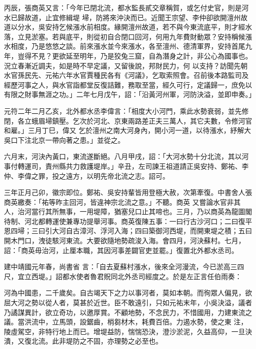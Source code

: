 \begin{pinyinscope}
 丙辰，張商英又言：「今年已閉北流，都水監長貳交章稱賀，或乞付史官，則是河水已歸故道，止宜修緝堤
 埽，防將來沖決而已。近聞王宗望、李仲卻欲開澶州故道以分水，吳安持乞候漲水前相度。緣開澶州故道，若不與今東流底平，則才經水落，立見淤塞。若與底平，則從初自合閉口回河，何用九年費財動眾？安持稱候漲水相度，乃是悠悠之談。前來漲水並今來漲水，各至澶州、德清軍界，安持首尾九年，豈得不見？更欲延至明年，乃是狡兔三窟，自為潛身之計，非公心為國事也。況立春漸近調夫，如是時不早定議，又留後說，邦財民力，何
 以支持？訪聞先朝水官孫民先、元祐六年水官賈種民各有《河議》，乞取索照會。召前後本路監司及經歷河事之人，與水官詣都堂反復詰難，務取至當，經久可行，定議歸一，庶免以有限之財事無涯之功。」二年七月戊午，詔：「沿黃河州軍，河防決溢，並即申奏。」



 元符二年二月乙亥，北外都水丞李偉言：「相度大小河門，乘此水勢衰弱，並先修閉，各立蛾眉埽鎮壓。乞次於河北、京東兩路差正夫三萬人，其它夫數，令修河官和雇。」三月丁巳，偉又
 乞於澶州之南大河身內，開小河一道，以待漲水，紓解大吳口下注北京一帶向著之患。」並從之。



 六月末，河決內黃口，東流遂斷絕。八月甲戌，詔：「大河水勢十分北流，其以河事付轉運司，責州縣共力救護堤岸。」辛丑，左司諫王祖道請正吳安持、鄭祐、李仲、李偉之罪，投之遠方，以明先帝北流之志。詔可。



 三年正月己卯，徽宗即位。鄭祐、吳安持輩皆用登極大赦，次第牽復。中書舍人張商英繳奏：「祐等昨主回河，皆違神宗北流之意。」不聽。商英
 又嘗論水官非其人，治河當行其所無事，一用堤障，猶塞兒口止其啼也。三月，乃以商英為龍圖閣待制、河北都轉運使兼專功提舉河事。商英復陳五事：一曰行古沙河口；二曰復平恩四埽；三曰引大河自古漳河、浮河入海；四曰築御河西堤，而開東堤之積；五曰開木門口，洩徒駭河東流。大要欲隨地勢疏浚入海。會四月，河決蘇村。七月，詔：「商英毋治河，止厘本職，其因河事差闢官吏並罷。」復置北外都水丞司。



 建中靖國元年春，尚書省
 言：「自去夏蘇村漲水，後來全河漫流，今已淤高三四尺，宜立西堤。」詔都水使者魯君貺同北外丞司經度之。於是左正言任伯雨奏：



 河為中國患，二千歲矣。自古竭天下之力以事河者，莫如本朝。而徇眾人偏見，欲屈大河之勢以從人者，莫甚於近世。臣不敢遠引，只如元祐末年，小吳決溢，議者乃譎謀異計，欲立奇功，以邀厚賞。不顧地勢，不念民力，不惜國用，力建東流之議。當洪流中，立馬頭，設鋸齒，梢芻材木，耗費百倍。力遏水勢，使之東
 注，陵虛駕空，非特行地上而已。增堤益防，惴惴恐決，澄沙淤泥，久益高仰，一旦決潰，又復北流。此非堤防之不固，亦理勢之必至也。




\end{pinyinscope}

